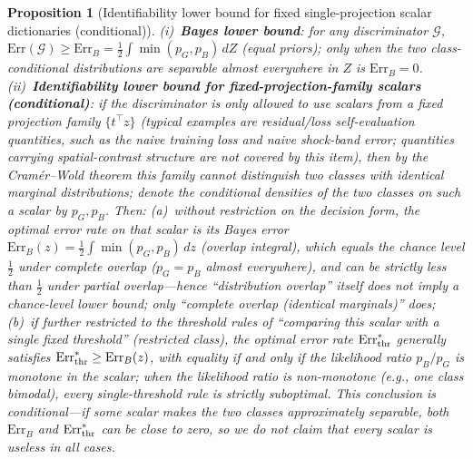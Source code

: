\documentclass[11pt]{article}
\newtheorem{proposition}{Proposition}[section]
\numberwithin{equation}{section}
\begin{document}
\begin{proposition}[Identifiability lower bound for fixed single-projection scalar dictionaries (conditional)]\label{prop:bayes}
(i)~\textbf{Bayes lower bound}: for any discriminator $\mathcal G$, $\mathrm{Err}(\mathcal G)\ge\mathrm{Err}_B=\tfrac12\int\min(p_G,p_B)\,dZ$ (equal priors); only when the two class-conditional distributions are separable almost everywhere in $Z$ is $\mathrm{Err}_B=0$.
(ii)~\textbf{Identifiability lower bound for fixed-projection-family scalars (conditional)}: if the discriminator is only allowed to use scalars from a fixed projection family $\{t^\top z\}$ (typical examples are residual/loss self-evaluation quantities, such as the naive training loss and naive shock-band error; quantities carrying spatial-contrast structure are not covered by this item), then by the Cram\'er--Wold theorem this family cannot distinguish two classes with identical marginal distributions; denote the conditional densities of the two classes on such a scalar by $p_G,p_B$. Then: (a)~without restriction on the decision form, the optimal error rate on that scalar is its Bayes error $\mathrm{Err}_B(z)=\tfrac12\int\min(p_G,p_B)\,dz$ (overlap integral), which equals the chance level $\tfrac12$ under \emph{complete overlap} ($p_G=p_B$ almost everywhere), and can be strictly less than $\tfrac12$ under \emph{partial overlap}---hence ``distribution overlap'' itself does \emph{not} imply a chance-level lower bound; only ``complete overlap (identical marginals)'' does; (b)~if further restricted to the \emph{threshold rules} of ``comparing this scalar with a single fixed threshold'' (restricted class), the optimal error rate $\mathrm{Err}_{\rm thr}^*$ generally satisfies $\mathrm{Err}_{\rm thr}^*\ge\mathrm{Err}_B(z)$, with equality if and only if the likelihood ratio $p_B/p_G$ is monotone in the scalar; when the likelihood ratio is non-monotone (e.g., one class bimodal), every single-threshold rule is strictly suboptimal. This conclusion is conditional---if some scalar makes the two classes approximately separable, both $\mathrm{Err}_B$ and $\mathrm{Err}_{\rm thr}^*$ can be close to zero, so we do not claim that every scalar is useless in all cases.

\end{proposition}
\end{document}
